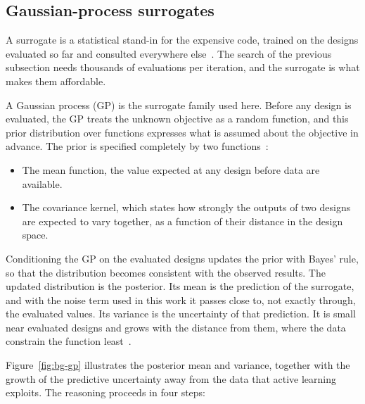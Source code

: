 \subsection{Gaussian-process surrogates}
\label{sec:bg-gp}

A surrogate is a statistical stand-in for the expensive code, trained
on the designs evaluated so far and consulted everywhere
else~\cite{forrester_book_2008}. The search of the previous subsection
needs thousands of evaluations per iteration, and the surrogate is what
makes them affordable.

A Gaussian process (GP) is the surrogate family used here. Before any
design is evaluated, the GP treats the unknown objective as a random
function, and this prior distribution over functions expresses what is
assumed about the objective in advance. The prior is specified
completely by two functions~\cite{rasmussen_gp_2006}:

\begin{itemize}
  \item The mean function, the value expected at any design before data
        are available.

  \item The covariance kernel, which states how strongly the outputs of
        two designs are expected to vary together, as a function of
        their distance in the design space.
\end{itemize}

Conditioning the GP on the evaluated designs updates the prior with
Bayes' rule, so that the distribution becomes consistent with the
observed results. The updated distribution is the posterior. Its mean is
the prediction of the surrogate, and with the noise term used in this
work it passes close to, not exactly through, the evaluated values. Its
variance is the uncertainty of that prediction. It is small near
evaluated designs and grows with the distance from them, where the data
constrain the function least~\cite{rasmussen_gp_2006}.

Figure~\ref{fig:bg-gp} illustrates the posterior mean and variance,
together with the growth of the predictive uncertainty away from the
data that active learning exploits. The reasoning proceeds in four steps:

